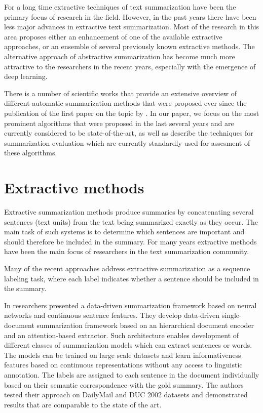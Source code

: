 \documentclass[11pt,a4paper,onecolumn]{article}
\begin{document}
For a long time extractive techniques of text summarization have been the primary focus of research in the field.
However, in the past years there have been less major advances in extractive text summarization.
Most of the research in this area proposes either an enhancement of one of the available extractive approaches, or an ensemble of several previously known extractive methods.
The alternative approach of abstractive summarization has become much more attractive to the researchers in the recent years, especially with the emergence of deep learning.

There is a number of scientific works \cite{nenkova2011automatic, lloret2012text, saggion2013automatic} that provide an extensive overview of different automatic summarization methods that were proposed ever since the publication of the first paper on the topic by \cite{luhn1958automatic}.
In our paper, we focus on the most prominent algorithms that were proposed in the last several years and are currently considered to be state-of-the-art, as well as describe the techniques for summarization evaluation which are currently standardly used for assesment of these algorithms.


\section{Extractive methods}
Extractive summarization methods produce summaries by concatenating several sentences (text units) from the text being summarized exactly as they occur.
The main task of such systems is to determine which sentences are important and should therefore be included in the summary.
For many years extractive methods have been the main focus of researchers in the text summarization community.

Many of the recent approaches address extractive summarization as a sequence labeling task, where each label indicates whether a sentence should be included in the summary.

In \cite{cheng2016neural} researchers presented a data-driven summarization framework based on neural networks and continuous sentence features.
They develop data-driven single-document summarization framework based on an hierarchical document encoder and an attention-based extractor.
Such architecture enables development of different classes of summarization models which can extract sentences or words.
The models can be trained on large scale datasets and learn informativeness features based on continuous representations without any access to linguistic annotation.
The labels are assigned to each sentence in the document individually based on their semantic correspondence with the gold summary.
The authors tested their approach on DailyMail and DUC 2002 datasets and demonstrated results that are comparable to the state of the art.
\end{document}
